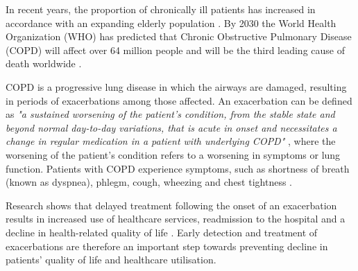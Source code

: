 In recent years, the proportion of chronically ill patients has increased in accordance with an expanding elderly population \citep{motWHO}. By 2030 the World Health Organization (WHO) has predicted that Chronic Obstructive Pulmonary Disease (COPD) will affect over 64 million people and will be the third leading cause of death worldwide \citep{motStat}. 

COPD is a progressive lung disease in which the airways are damaged, resulting in periods of exacerbations among those affected. An exacerbation can be defined as \textit{"a sustained worsening of the patient's condition, from the stable state and beyond normal day-to-day variations, that is acute in onset and necessitates a change in regular medication in a patient with underlying COPD"} \citep{motExace}, where the worsening of the patient's condition refers to a worsening in symptoms or lung function. Patients with COPD experience symptoms, such as shortness of breath (known as dyspnea), phlegm, cough, wheezing and chest tightness \citep{motSymp}. 
 
 Research shows that delayed treatment following the onset of an exacerbation results in increased use of healthcare services, readmission to the hospital and a decline in health-related quality of life \citep{motExace}. Early detection and treatment of exacerbations are therefore an important step towards preventing decline in patients' quality of life and healthcare utilisation.  



